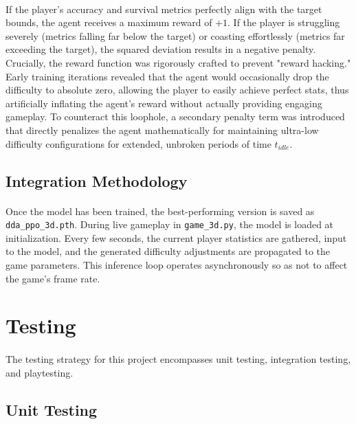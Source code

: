 \paragraph{} If the player's accuracy and survival metrics perfectly align with the target bounds, the agent receives a maximum reward of $+1$. If the player is struggling severely (metrics falling far below the target) or coasting effortlessly (metrics far exceeding the target), the squared deviation results in a negative penalty. Crucially, the reward function was rigorously crafted to prevent "reward hacking." Early training iterations revealed that the agent would occasionally drop the difficulty to absolute zero, allowing the player to easily achieve perfect stats, thus artificially inflating the agent's reward without actually providing engaging gameplay. To counteract this loophole, a secondary penalty term was introduced that directly penalizes the agent mathematically for maintaining ultra-low difficulty configurations for extended, unbroken periods of time $t_{idle}$.

\subsection{Integration Methodology}
\paragraph{} Once the model has been trained, the best-performing version is saved as \texttt{dda\_ppo\_3d.pth}. During live gameplay in \texttt{game\_3d.py}, the model is loaded at initialization. Every few seconds, the current player statistics are gathered, input to the model, and the generated difficulty adjustments are propagated to the game parameters. This inference loop operates asynchronously so as not to affect the game's frame rate.

\section{Testing}
\paragraph{} The testing strategy for this project encompasses unit testing, integration testing, and playtesting.

\subsection{Unit Testing}
